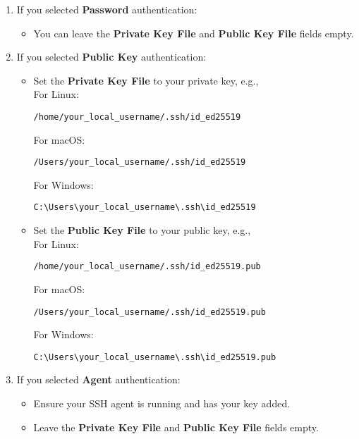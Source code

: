 \documentclass[12pt,letterpaper]{article}
\begin{document}
\begin{enumerate}
\begin{enumerate}
\begin{enumerate}
            \item If you selected \textbf{Password} authentication:
            \begin{itemize}
                \item You can leave the \textbf{Private Key File} and \textbf{Public Key File} fields empty.
            \end{itemize}

            \item If you selected \textbf{Public Key} authentication:
            \begin{itemize}
                \item Set the \textbf{Private Key File} to your private key, e.g.,\\
                For Linux:
                \begin{lstlisting}[style=custombash]
/home/your_local_username/.ssh/id_ed25519
                \end{lstlisting}
                For macOS:
                \begin{lstlisting}[style=custombash]
/Users/your_local_username/.ssh/id_ed25519
                \end{lstlisting}
                For Windows:
                \begin{lstlisting}[style=custombash]
C:\Users\your_local_username\.ssh\id_ed25519
                \end{lstlisting}
                \item Set the \textbf{Public Key File} to your public key, e.g.,\\
                For Linux:
                \begin{lstlisting}[style=custombash]
/home/your_local_username/.ssh/id_ed25519.pub
                \end{lstlisting}
                For macOS:
                \begin{lstlisting}[style=custombash]
/Users/your_local_username/.ssh/id_ed25519.pub
                \end{lstlisting}
                For Windows:
                \begin{lstlisting}[style=custombash]
C:\Users\your_local_username\.ssh\id_ed25519.pub
                \end{lstlisting}
            \end{itemize}

            \item If you selected \textbf{Agent} authentication:
            \begin{itemize}
                \item Ensure your SSH agent is running and has your key added.
                \item Leave the \textbf{Private Key File} and \textbf{Public Key File} fields empty.
            \end{itemize}


\end{enumerate}
\end{enumerate}
\end{enumerate}
\end{document}
